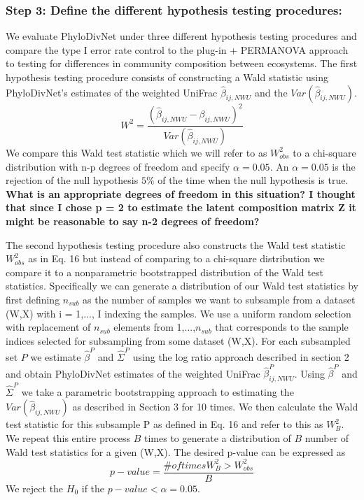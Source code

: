 \documentclass{article}
\begin{document}
\subsubsection{\textbf{Step 3: Define the different hypothesis testing procedures:}}

We evaluate PhyloDivNet under three different hypothesis testing procedures and compare the type I error rate control to the plug-in + PERMANOVA approach to testing for differences in community composition between ecosystems. The first hypothesis testing procedure consists of constructing a Wald statistic using PhyloDivNet's estimates of the weighted UniFrac $\hat{\beta}_{ij,NWU}$ and the $Var(\hat{\beta}_{ij,NWU})$.
\begin{equation}
  W^2 = \frac{(\hat{\beta}_{ij,NWU} - \beta_{ij,NWU})^2}{Var(\hat{\beta}_{ij,NWU})}
\end{equation}
We compare this Wald test statistic which we will refer to as $W_{obs}^{2}$ to a chi-square distribution with n-p degrees of freedom and specify $\alpha = 0.05$. An $\alpha = 0.05$ is the rejection of the null hypothesis $5\%$ of the time when the null hypothesis is true. \textbf{What is an appropriate degrees of freedom in this situation? I thought that since I chose p = 2 to estimate the latent composition matrix Z it might be reasonable to say n-2 degrees of freedom?}

The second hypothesis testing procedure also constructs the Wald test statistic $W_{obs}^{2}$ as in Eq. 16 but instead of comparing to a chi-square distribution we compare it to a nonparametric bootstrapped distribution of the Wald test statistics. Specifically we can generate a distribution of our Wald test statistics by first defining $n_{sub}$ as the number of samples we want to subsample from a dataset (W,X) with i = 1,..., I indexing the samples. We use a uniform random selection with replacement of $n_{sub}$ elements from 1,...,$n_{sub}$ that corresponds to the sample indices selected for subsampling from some dataset (W,X). For each subsampled set $P$ we estimate $\hat{\beta}^P$ and $\hat{\Sigma}^P$ using the log ratio approach described in section 2 and obtain PhyloDivNet estimates of the weighted UniFrac $\hat{\beta}_{ij,NWU}^P$. Using $\hat{\beta}^P$ and $\hat{\Sigma}^P$ we take a parametric bootstrapping approach to estimating the $Var(\hat{\beta}_{ij,NWU})$ as described in Section 3 for 10 times. We then calculate the Wald test statistic for this subsample P as defined in Eq. 16 and refer to this as $W_{B}^{2}$. We repeat this entire process $B$ times to generate a distribution of $B$ number of Wald test statistics for a given (W,X). The desired p-value can be expressed as
\begin{equation}
  p-value = \frac{\# of times W_{B}^2 > W_{obs}^{2}}{B}
\end{equation}
We reject the $H_0$ if the $p-value < \alpha = 0.05$.
\end{document}
